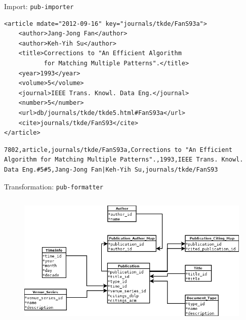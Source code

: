 \documentclass[12pt, utf8, ngerman, notes]{beamer}
\begin{document}
\begin{frame}[fragile]{Import: \texttt{pub-importer}}
\begin{verbatim}
<article mdate="2012-09-16" key="journals/tkde/FanS93a">
    <author>Jang-Jong Fan</author>
    <author>Keh-Yih Su</author>
    <title>Corrections to "An Efficient Algorithm
           for Matching Multiple Patterns".</title>
    <year>1993</year>
    <volume>5</volume>
    <journal>IEEE Trans. Knowl. Data Eng.</journal>
    <number>5</number>
    <url>db/journals/tkde/tkde5.html#FanS93a</url>
    <cite>journals/tkde/FanS93</cite>
</article>
\end{verbatim}
\begin{verbatim}
7802,article,journals/tkde/FanS93a,Corrections to "An Efficient
Algorithm for Matching Multiple Patterns".,1993,IEEE Trans. Knowl.
Data Eng.#5#5,Jang-Jong Fan|Keh-Yih Su,journals/tkde/FanS93
\end{verbatim}
\end{frame}

\begin{frame}{Transformation: \texttt{pub-formatter}}
\begin{columns}
      \column{\dimexpr\paperwidth}
      \begin{figure}[H]
          \begin{center}
              \includegraphics[width=\paperwidth]{pics/Star-Schema.png}
          \end{center}
      \end{figure}
	\end{columns}
\end{frame}
\end{document}
